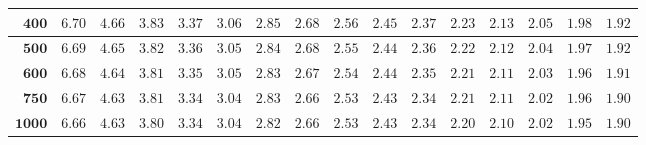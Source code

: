 \begin{longtable}{|r|r|r|r|r|r|r|r|r|r|r|r|r|r|r|r|}
    \(\mathbf{400}\) & \(6.70\) & \(4.66\) & \(3.83\) & \(3.37\) & \(3.06\) & \(2.85\) & \(2.68\) & \(2.56\) & \(2.45\) & \(2.37\) & \(2.23\) & \(2.13\) & \(2.05\) & \(1.98\) & \(1.92\) \\ \hline 
    \(\mathbf{500}\) & \(6.69\) & \(4.65\) & \(3.82\) & \(3.36\) & \(3.05\) & \(2.84\) & \(2.68\) & \(2.55\) & \(2.44\) & \(2.36\) & \(2.22\) & \(2.12\) & \(2.04\) & \(1.97\) & \(1.92\) \\ \hline 
    \(\mathbf{600}\) & \(6.68\) & \(4.64\) & \(3.81\) & \(3.35\) & \(3.05\) & \(2.83\) & \(2.67\) & \(2.54\) & \(2.44\) & \(2.35\) & \(2.21\) & \(2.11\) & \(2.03\) & \(1.96\) & \(1.91\) \\ \hline 
    \(\mathbf{750}\) & \(6.67\) & \(4.63\) & \(3.81\) & \(3.34\) & \(3.04\) & \(2.83\) & \(2.66\) & \(2.53\) & \(2.43\) & \(2.34\) & \(2.21\) & \(2.11\) & \(2.02\) & \(1.96\) & \(1.90\) \\ \hline 
    \(\mathbf{1000}\) & \(6.66\) & \(4.63\) & \(3.80\) & \(3.34\) & \(3.04\) & \(2.82\) & \(2.66\) & \(2.53\) & \(2.43\) & \(2.34\) & \(2.20\) & \(2.10\) & \(2.02\) & \(1.95\) & \(1.90\) \\ \hline 


\end{longtable}
\changefontsizes{11pt}

\setlength{\LTleft}{0in} %
\setlength{\LTright}{0in} %


\newpage

